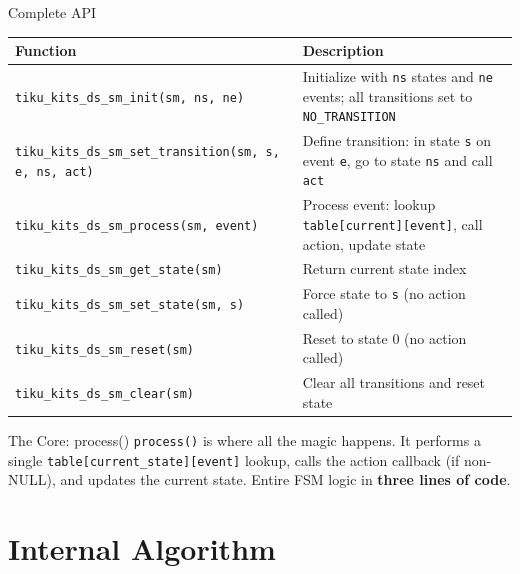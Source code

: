 \documentclass[aspectratio=169, 10pt]{beamer}
\begin{document}
\begin{frame}[fragile]{Complete API}
\begin{table}
\centering
\small
\begin{tabular}{@{}lp{8cm}@{}}
\toprule
\textbf{Function} & \textbf{Description} \\
\midrule
\texttt{tiku\_kits\_ds\_sm\_init(sm, ns, ne)}
  & Initialize with \texttt{ns} states and \texttt{ne} events; all transitions set to \texttt{NO\_TRANSITION} \\
\texttt{tiku\_kits\_ds\_sm\_set\_transition(sm, s, e, ns, act)}
  & Define transition: in state \texttt{s} on event \texttt{e}, go to state \texttt{ns} and call \texttt{act} \\
\midrule
\texttt{tiku\_kits\_ds\_sm\_process(sm, event)}
  & Process event: lookup \texttt{table[current][event]}, call action, update state \\
\texttt{tiku\_kits\_ds\_sm\_get\_state(sm)}
  & Return current state index \\
\texttt{tiku\_kits\_ds\_sm\_set\_state(sm, s)}
  & Force state to \texttt{s} (no action called) \\
\midrule
\texttt{tiku\_kits\_ds\_sm\_reset(sm)}
  & Reset to state 0 (no action called) \\
\texttt{tiku\_kits\_ds\_sm\_clear(sm)}
  & Clear all transitions and reset state \\
\bottomrule
\end{tabular}
\end{table}

\vspace{0.3em}
\begin{alertblock}{The Core: process()}
\texttt{process()} is where all the magic happens. It performs a single
\texttt{table[current\_state][event]} lookup, calls the action callback
(if non-NULL), and updates the current state. Entire FSM logic
in \textbf{three lines of code}.
\end{alertblock}
\end{frame}

\section{Internal Algorithm}
\end{document}
